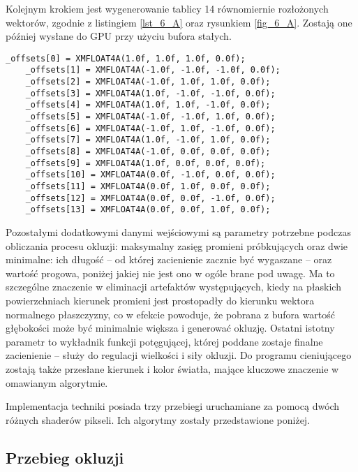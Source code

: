 	Kolejnym krokiem jest wygenerowanie tablicy 14 równomiernie rozłożonych wektorów, zgodnie z listingiem \ref{lst_6_A} oraz rysunkiem \ref{fig_6_A}. Zostają one później wysłane do GPU przy użyciu bufora stałych.\pagebreak
	
	\begin{lstlisting}[language=HLSL,caption={Generowanie równomiernie rozłożonych wektorów.},label={lst_6_A}]
	_offsets[0] = XMFLOAT4A(1.0f, 1.0f, 1.0f, 0.0f);
	_offsets[1] = XMFLOAT4A(-1.0f, -1.0f, -1.0f, 0.0f);
	_offsets[2] = XMFLOAT4A(-1.0f, 1.0f, 1.0f, 0.0f);
	_offsets[3] = XMFLOAT4A(1.0f, -1.0f, -1.0f, 0.0f);
	_offsets[4] = XMFLOAT4A(1.0f, 1.0f, -1.0f, 0.0f);
	_offsets[5] = XMFLOAT4A(-1.0f, -1.0f, 1.0f, 0.0f);
	_offsets[6] = XMFLOAT4A(-1.0f, 1.0f, -1.0f, 0.0f);
	_offsets[7] = XMFLOAT4A(1.0f, -1.0f, 1.0f, 0.0f);
	_offsets[8] = XMFLOAT4A(-1.0f, 0.0f, 0.0f, 0.0f);
	_offsets[9] = XMFLOAT4A(1.0f, 0.0f, 0.0f, 0.0f);
	_offsets[10] = XMFLOAT4A(0.0f, -1.0f, 0.0f, 0.0f);
	_offsets[11] = XMFLOAT4A(0.0f, 1.0f, 0.0f, 0.0f);
	_offsets[12] = XMFLOAT4A(0.0f, 0.0f, -1.0f, 0.0f);
	_offsets[13] = XMFLOAT4A(0.0f, 0.0f, 1.0f, 0.0f);
	\end{lstlisting}
	
	
	\raggedbottom
	Pozostałymi dodatkowymi danymi wejściowymi są parametry potrzebne podczas obliczania procesu okluzji: maksymalny zasięg promieni próbkujących oraz dwie minimalne: ich długość -- od której zacienienie zacznie być wygaszane -- oraz wartość progowa, poniżej jakiej nie jest ono w ogóle brane pod uwagę. Ma to szczególne znaczenie w eliminacji artefaktów występujących, kiedy na płaskich powierzchniach kierunek promieni jest prostopadły do kierunku wektora normalnego płaszczyzny, co w efekcie powoduje, że pobrana z bufora wartość głębokości może być minimalnie większa i generować okluzję. Ostatni istotny parametr to wykładnik funkcji potęgującej, której poddane zostaje finalne zacienienie -- służy do regulacji wielkości i siły okluzji. Do programu cieniującego zostają także przesłane kierunek i kolor światła, mające kluczowe znaczenie w omawianym algorytmie.
	
	Implementacja techniki posiada trzy przebiegi uruchamiane za pomocą dwóch różnych shaderów pikseli. Ich algorytmy zostały przedstawione poniżej.\pagebreak
	
	\subsection{Przebieg okluzji}
	\label{t:impl:a:pass1}
	
